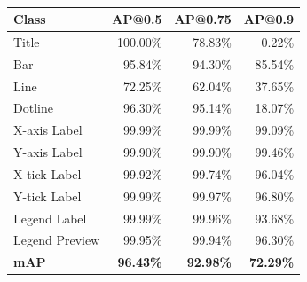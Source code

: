 \documentclass[10pt,twocolumn,letterpaper]{article}
\begin{document}



\begin{table}[t]
\footnotesize
\begin{center}
\begin{tabular}{|l|r|r|r|}
\hline 
\textbf{Class} & \textbf{AP@0.5} & \textbf{AP@0.75} & \textbf{AP@0.9} \\ \hline
Title & 100.00\% & 78.83\% & 0.22\% \\
Bar & 95.84\% & 94.30\% & 85.54\% \\
Line & 72.25\% & 62.04\% & 37.65\% \\
Dotline & 96.30\% & 95.14\% & 18.07\% \\
X-axis Label & 99.99\% & 99.99\% & 99.09\% \\
Y-axis Label & 99.90\% & 99.90\% & 99.46\% \\
X-tick Label & 99.92\% & 99.74\% & 96.04\% \\
Y-tick Label & 99.99\% & 99.97\% & 96.80\% \\
Legend Label & 99.99\% & 99.96\% & 93.68\% \\
Legend Preview & 99.95\% & 99.94\% & 96.30\% \\ \hline
\textbf{mAP} & \textbf{96.43\%} & \textbf{92.98\%} & \textbf{72.29\%}\\ \hline
\end{tabular}
\caption{}
\label{maskrcnn_ved}
\end{center}
\end{table}
\end{document}
